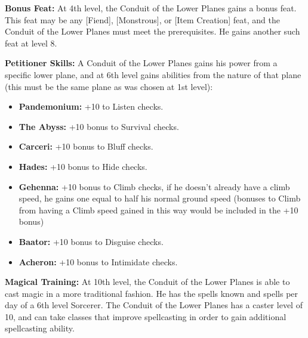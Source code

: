 \documentclass[10pt]{article}
\newcommand{\ability}[2]{\smallskip \textbf{#1} #2}
\begin{document}
\ability{Bonus Feat:}{ At 4th level, the Conduit of the Lower Planes gains a bonus feat. This feat may be any [Fiend], [Monstrous], or [Item Creation] feat, and the Conduit of the Lower Planes must meet the prerequisites. He gains another such feat at level 8.}

\ability{Petitioner Skills:}{ A Conduit of the Lower Planes gains his power from a specific lower plane, and at 6th level gains abilities from the nature of that plane (this must be the same plane as was chosen at 1st level):}
\begin{itemize}
    \item \ability{Pandemonium:}{ +10 to Listen checks.}
    \item \ability{The Abyss:}{ +10 bonus to Survival checks.}
    \item \ability{Carceri:}{ +10 bonus to Bluff checks.}
    \item \ability{Hades:}{ +10 bonus to Hide checks.}
    \item \ability{Gehenna:}{ +10 bonus to Climb checks, if he doesn't already have a climb speed, he gains one equal to half his normal ground speed (bonuses to Climb from having a Climb speed gained in this way would be included in the +10 bonus)}
    \item \ability{Baator:}{ +10 bonus to Disguise checks.}
    \item \ability{Acheron:}{ +10 bonus to Intimidate checks.}
\end{itemize}
\ability{Magical Training:}{ At 10th level, the Conduit of the Lower Planes is able to cast magic in a more traditional fashion. He has the spells known and spells per day of a 6th level Sorcerer. The Conduit of the Lower Planes has a caster level of 10, and can take classes that improve spellcasting in order to gain additional spellcasting ability.}
\end{document}
